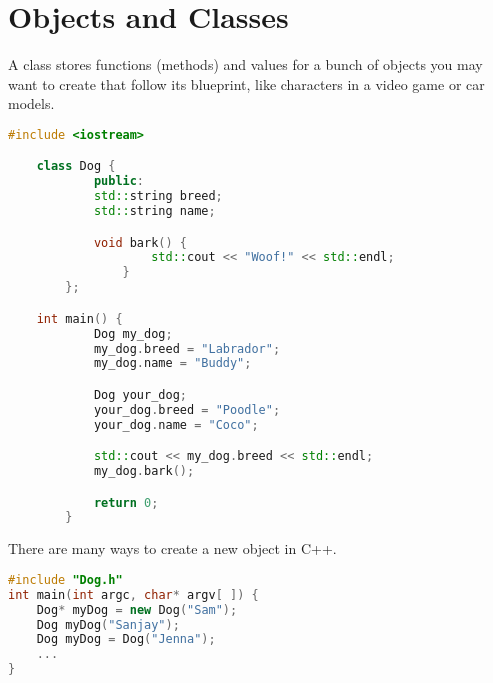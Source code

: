 \section{Objects and Classes}
A class stores functions (methods) and values for a bunch
of objects you may want to create that follow its blueprint,
like characters in a video game or car models.

\begin{lstlisting}[language=C++,caption=Objects and Classes]
    #include <iostream>

    class Dog {
            public:
            std::string breed;
            std::string name;

            void bark() {
                    std::cout << "Woof!" << std::endl;
                }
        };

    int main() {
            Dog my_dog;
            my_dog.breed = "Labrador";
            my_dog.name = "Buddy";

            Dog your_dog;
            your_dog.breed = "Poodle";
            your_dog.name = "Coco";

            std::cout << my_dog.breed << std::endl;
            my_dog.bark();

            return 0;
        }
\end{lstlisting}

There are many ways to create a new object in C++.

\begin{lstlisting}[language=C++,caption=Alternative Instantiations]
#include "Dog.h"
int main(int argc, char* argv[ ]) {
    Dog* myDog = new Dog("Sam");
    Dog myDog("Sanjay");
    Dog myDog = Dog("Jenna");
    ...
}
\end{lstlisting}